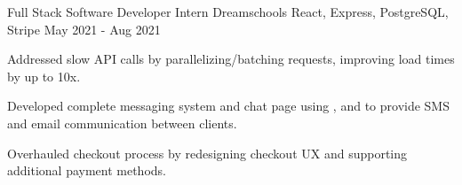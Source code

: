 \begin{cventries}

  \cventry
    {Full Stack Software Developer Intern} %
    {Dreamschools} %
    {React, Express, PostgreSQL, Stripe} %
    {May 2021 - Aug 2021} %
    {
      \begin{cvitems} %
        \item {Addressed slow  API calls by parallelizing/batching requests, improving load times by up to 10x.}
        \item {Developed complete messaging system and chat page using ,  and  to provide SMS and email communication between clients.}
        \item {Overhauled checkout process by redesigning checkout UX and supporting additional payment methods.}
      \end{cvitems}
    }
\end{cventries}
